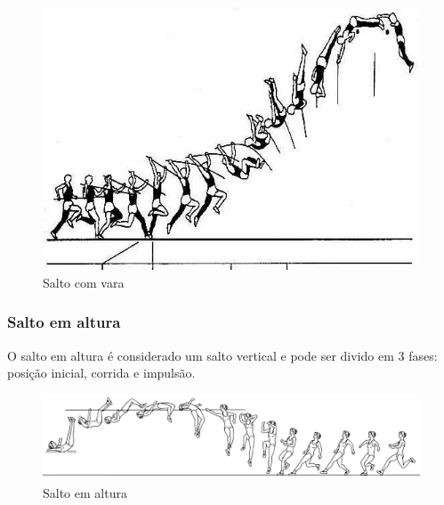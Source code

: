 \documentclass{report}
\begin{document}
            
            
            
            \FloatBarrier
            \begin{figure}[h]
            \center
            \includegraphics[scale=.4,angle=0]{saltocomvara.jpg}
            \caption{Salto com vara}
            \label{fig:vara.2}
            \end{figure}
            \FloatBarrier
            
            
            
            \subsubsection{Salto em altura}
            O salto em altura é considerado um salto vertical e  pode ser divido em 3 fases:  posição inicial, corrida e impulsão. 
            
             \FloatBarrier
            \begin{figure}[h]
            \center
            \includegraphics[scale=.42,angle=0]{saltoaltura.jpg}
            \caption{Salto em altura}
            \label{fig:saltoaltura.2}
            \end{figure}
            \FloatBarrier
            
\end{document}
